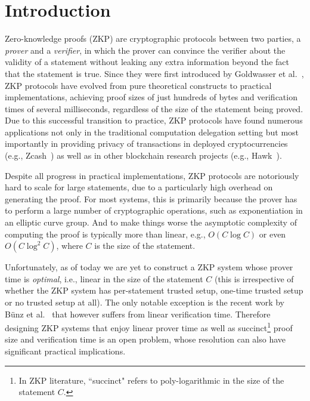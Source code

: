 \section{Introduction}\label{sec:intro}


Zero-knowledge proofs (ZKP) are cryptographic protocols between two parties, a \emph{prover} and a \emph{verifier}, in which the prover can convince the verifier about the validity of a statement without leaking any extra information beyond the fact that the statement is true.  Since they were first introduced by Goldwasser et al.~\cite{goldwasser1989knowledge}, ZKP protocols have evolved from pure theoretical constructs to practical implementations, achieving proof sizes  of just hundreds of bytes and verification times of several milliseconds, regardless of the size of the statement being proved. Due to this successful transition to practice, ZKP protocols have found numerous applications not only in the traditional computation delegation setting but most importantly in providing privacy of transactions in deployed cryptocurrencies (e.g., Zcash~\cite{zerocash}) as well as in other blockchain research projects (e.g., Hawk~\cite{kosba2016hawk}). 




 




 




Despite all progress in practical implementations, ZKP protocols are notoriously hard to scale for large statements, due to a particularly high overhead on generating the proof. For most systems, this is primarily because the prover has to  perform a large number of cryptographic operations, such as exponentiation in an elliptic curve group. And to make things worse the asymptotic complexity of computing the proof is typically more than linear, e.g., $O(C\log C)$ or even $O(C\log^2 C)$, where $C$ is the size of the statement.

Unfortunately, as of today we are yet to construct a ZKP system whose prover time is \emph{optimal}, i.e., linear in the size of the statement $C$ (this is irrespective of whether the ZKP system has per-statement trusted setup, one-time trusted setup or no trusted setup at all). The only notable exception is the recent work by B{\"u}nz et al.~\cite{bulletproofs} that however suffers from linear verification time. Therefore designing ZKP systems that enjoy linear prover time as well as succinct\footnote{In ZKP literature, ``succinct" refers to poly-logarithmic in the size of the statement $C$.} proof size and verification time is an open problem, whose resolution can also have significant practical implications. 



